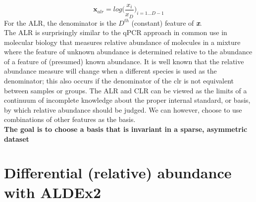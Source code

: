 \documentclass[a0,portrait]{a0poster}
\begin{document}
\begin{multicols}{2}
\begin{equation}
\textbf{x}_{alr} = log  \big( \frac{x_i}{x_D}   \big)_{i=1\dots D-1}
\label{eq:ALR}
\end{equation}
For the ALR, the denominator is the $D^{th}$ (constant) feature of \textit{\textbf{x}}.\\

The ALR is surprisingly similar to the qPCR approach in common use in molecular biology that measures relative abundance of molecules in a mixture where the feature of unknown abundance is determined relative to the abundance of a feature of (presumed) known abundance. It is well known that the relative abundance measure will change when a different species is used as the denominator; this also occurs if the denominator of the clr is not equivalent between samples or groups. The ALR and CLR can be viewed as the limits of a continuum of incomplete knowledge about the proper internal standard, or basis, by which relative abundance should be judged. We can however, choose to use combinations of other features as the basis.\\

\textbf{The goal is to choose a basis that is invariant in a sparse, asymmetric dataset}
\vspace{-1cm}
\section*{Differential (relative) abundance  with ALDEx2 \cite{fernandes:2013,fernandes:2014}}


\end{multicols}
\end{document}
